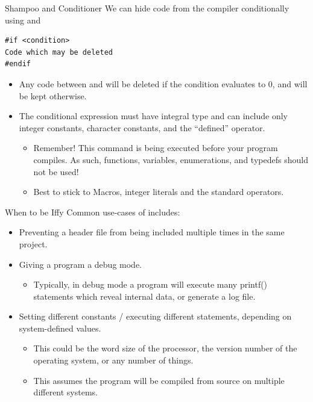 \documentclass[11pt]{beamer}
\let\OldTexttt\texttt
\renewcommand{\texttt}[1]{\OldTexttt{\color{teal}{#1}}}
\begin{document}
\begin{frame}[fragile=singleslide]{Shampoo and Conditioner}
We can hide code from the compiler conditionally using \texttt{\#if} and \texttt{\#endif}
\begin{lstlisting}[style=C]
#if <condition>
Code which may be deleted
#endif
\end{lstlisting}
\begin{itemize}
\item Any code between \texttt{\#if} and \texttt{\#endif} will be deleted if the condition evaluates to 0, and will be kept otherwise.
\item The conditional expression must have integral type and can include only integer constants, character constants, and the ``defined'' operator.
\begin{itemize}
\item Remember! This command is being executed before your program compiles. As such, functions, variables, enumerations, and typedefs should not be used! 
\item Best to stick to Macros, integer literals and the standard operators.  
\end{itemize}
\end{itemize}
\end{frame}

\begin{frame}{When to be Iffy}
Common use-cases of \texttt{\#if} includes:
\begin{itemize}
\item Preventing a header file from being included multiple times in the same project.
\item Giving a program a debug mode.
\begin{itemize}
\item Typically, in debug mode a program will execute many printf() statements which reveal internal data, or generate a log file.
\end{itemize}
\item Setting different constants / executing different statements, depending on system-defined values.
\begin{itemize}
\item This could be the word size of the processor, the version number of the operating system, or any number of things.  
\item This assumes the program will be compiled from source on multiple different systems.  
\end{itemize}
\end{itemize}
\end{frame}
\end{document}
